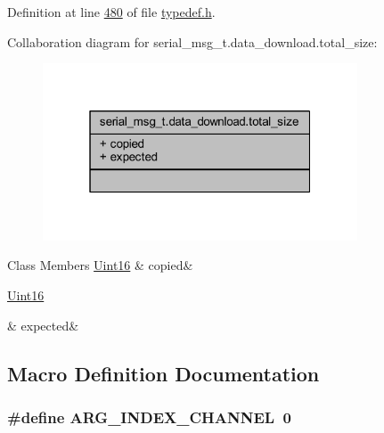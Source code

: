 Definition at line \hyperlink{a00001_source_l00480}{480} of file \hyperlink{a00001_source}{typedef.\+h}.



Collaboration diagram for serial\+\_\+msg\+\_\+t.\+data\+\_\+download.\+total\+\_\+size\+:
\nopagebreak
\begin{figure}[H]
\begin{center}
\leavevmode
\includegraphics[width=265pt]{d9/dd6/a00272}
\end{center}
\end{figure}
\begin{DoxyFields}{Class Members}
\hypertarget{a00001_aac9f7584d3fd6d49faa7bcf5e1ebec1f}{\hyperlink{a00001_aae7407b021d43f7193a81a58cfb3e297}{Uint16}}\label{a00001_aac9f7584d3fd6d49faa7bcf5e1ebec1f}
&
copied&
\\
\hline

\hypertarget{a00001_acd26d9e10ce691cc69aa2b90dcebbdac}{\hyperlink{a00001_aae7407b021d43f7193a81a58cfb3e297}{Uint16}}\label{a00001_acd26d9e10ce691cc69aa2b90dcebbdac}
&
expected&
\\
\hline

\end{DoxyFields}


\subsection{Macro Definition Documentation}
\hypertarget{a00001_a19b4a73c575adf309d87222653af2945}{
\subsubsection[{A\+R\+G\+\_\+\+I\+N\+D\+E\+X\+\_\+\+C\+H\+A\+N\+N\+E\+L}]{\setlength{\rightskip}{0pt plus 5cm}\#define A\+R\+G\+\_\+\+I\+N\+D\+E\+X\+\_\+\+C\+H\+A\+N\+N\+E\+L~0}}\label{a00001_a19b4a73c575adf309d87222653af2945}


